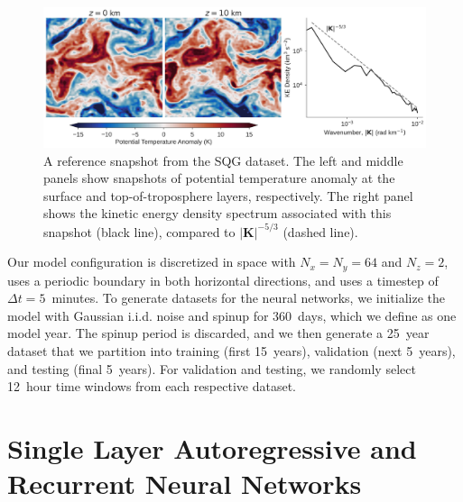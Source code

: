 \documentclass[draft]{agujournal2019}
\newcommand{\nvertical}{N_{z}}
\begin{document}
\begin{figure}
    \centering
    \includegraphics[width=\textwidth]{sqg_reference_plot.jpg}
    \caption{A reference snapshot from the SQG dataset. The left and middle panels
        show snapshots of potential temperature anomaly at the surface and
        top-of-troposphere layers, respectively.
        The right panel shows the kinetic energy density spectrum associated
        with this snapshot (black line), compared to
        $|\mathbf{K}|^{-5/3}$ (dashed line).
    }
    \label{fig:sqg-reference}
\end{figure}

Our model configuration is discretized in space with $N_x = N_y = 64$ and $\nvertical=2$,
uses a periodic boundary in both horizontal directions,
and uses a timestep of $\Delta t=5$~minutes.
To generate datasets for the neural networks, we initialize the model with Gaussian i.i.d.
noise and spinup for 360~days, which we define as one model year.
The spinup period is discarded, and we then generate a 25~year dataset that we partition
into training (first 15~years), validation (next 5~years), and testing
(final 5~years).
For validation and testing, we randomly select 12~hour time windows from each
respective dataset.


\section{Single Layer Autoregressive and Recurrent Neural Networks}
\label{sec:rnn-architecture}
\end{document}
